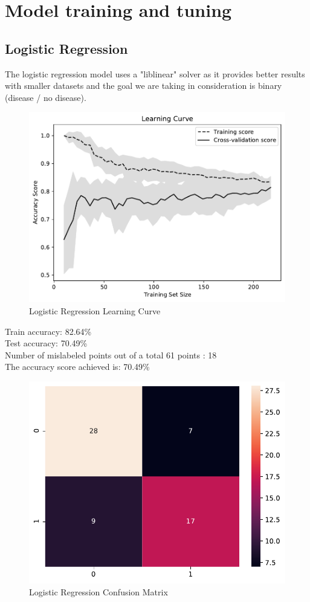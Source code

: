 \documentclass[conference]{IEEEtran}
\begin{document}
\section{Model training and tuning}

\subsection{Logistic Regression}
The logistic regression model uses a "liblinear" solver as it provides better results with smaller datasets and the goal we are taking in consideration is binary (disease / no disease).

\begin{figure}[H]
    \centerline{\includegraphics[width=0.9\linewidth]{images/LogisticRegression_lc.pdf}}
    \caption{Logistic Regression Learning Curve}
    \label{lr_lc}
\end{figure}

\noindent
Train accuracy: 82.64\%
\\Test accuracy: 70.49\%
\\[\baselineskip]
Number of mislabeled points out of a total 61 points : 18
\\The accuracy score achieved is: 70.49\%

\begin{figure}[H]
    \centerline{\includegraphics[width=0.8\linewidth]{images/log_reg_cm.pdf}}
    \caption{Logistic Regression Confusion Matrix}
    \label{lr_cm}
\end{figure}
\end{document}
